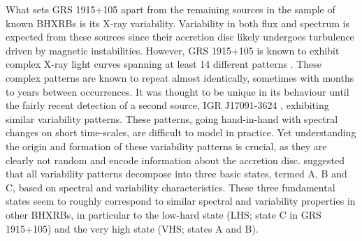 \documentclass[12pt]{emulateapj}
\begin{document}
What sets GRS 1915+105 apart from the remaining sources in the sample of known BHXRBs is its X-ray variability. Variability in both flux and spectrum is expected from these sources since their accretion disc likely undergoes turbulence driven by magnetic instabilities. However, GRS 1915+105 is known to exhibit complex X-ray light curves spanning at least 14 different patterns \citep{belloni2000, kleinwolt2002, hannikainen2003, hannikainen2005}. These complex patterns are known to repeat almost identically, sometimes with months to years between occurrences. It was thought to be unique in its behaviour until the fairly recent detection of a second source, IGR J17091-3624 \citep{altamirano2011}, exhibiting similar variability patterns. 
These patterns, going hand-in-hand with spectral changes on short time-scales, are difficult to model in practice.  Yet understanding the origin and formation of these variability patterns is crucial, as they are clearly not random and encode information about the accretion disc. \citet{belloni1997a, belloni1997b, belloni2000} suggested that all variability patterns decompose into three basic states, termed A, B and C, based on spectral and variability characteristics. These three fundamental states seem to roughly correspond to similar spectral and variability properties in other BHXRBs, in particular to the low-hard state (LHS; state C in GRS 1915+105) and the very high state (VHS; states A and B). 
\end{document}
